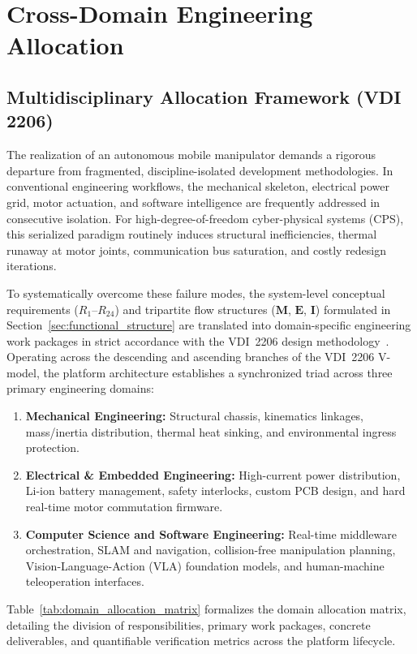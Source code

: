 \section{Cross-Domain Engineering Allocation}
\label{sec:domain_allocation}

\subsection{Multidisciplinary Allocation Framework (VDI 2206)}
The realization of an autonomous mobile manipulator demands a rigorous departure from fragmented, discipline-isolated development methodologies. In conventional engineering workflows, the mechanical skeleton, electrical power grid, motor actuation, and software intelligence are frequently addressed in consecutive isolation. For high-degree-of-freedom cyber-physical systems (CPS), this serialized paradigm routinely induces structural inefficiencies, thermal runaway at motor joints, communication bus saturation, and costly redesign iterations. 

To systematically overcome these failure modes, the system-level conceptual requirements ($R_1$--$R_{24}$) and tripartite flow structures ($\mathbf{M}$, $\mathbf{E}$, $\mathbf{I}$) formulated in Section~\ref{sec:functional_structure} are translated into domain-specific engineering work packages in strict accordance with the VDI~2206 design methodology~\cite{vdi2206}. Operating across the descending and ascending branches of the VDI~2206 V-model, the platform architecture establishes a synchronized triad across three primary engineering domains:
\begin{enumerate}[leftmargin=1.5em]
  \item \textbf{Mechanical Engineering:} Structural chassis, kinematics linkages, mass/inertia distribution, thermal heat sinking, and environmental ingress protection.
  \item \textbf{Electrical \& Embedded Engineering:} High-current power distribution, Li-ion battery management, safety interlocks, custom PCB design, and hard real-time motor commutation firmware.
  \item \textbf{Computer Science and Software Engineering:} Real-time middleware orchestration, SLAM and navigation, collision-free manipulation planning, Vision-Language-Action (VLA) foundation models, and human-machine teleoperation interfaces.
\end{enumerate}

Table~\ref{tab:domain_allocation_matrix} formalizes the domain allocation matrix, detailing the division of responsibilities, primary work packages, concrete deliverables, and quantifiable verification metrics across the platform lifecycle.

